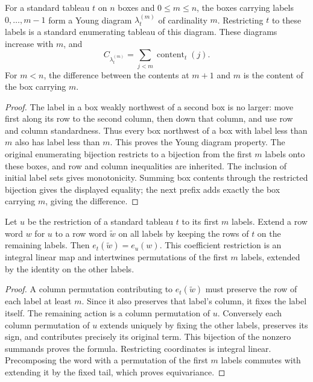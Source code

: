 \begin{lemma}
\label{lem:standard-prefix-diagram}
\leanok
For a standard tableau $t$ on $n$ boxes and $0\leq m\leq n$, the
boxes carrying labels $0,\ldots,m-1$ form a Young diagram
$\lambda_t^{(m)}$ of cardinality $m$. Restricting $t$ to these labels
is a standard enumerating tableau of this diagram. These diagrams
increase with $m$, and
\[
 C_{\lambda_t^{(m)}}=\sum_{j<m}\operatorname{content}_t(j).
\]
For $m<n$, the difference between the contents at $m+1$ and $m$
is the content of the box carrying $m$.
\end{lemma}
\begin{proof}
The label in a box weakly northwest of a second box is no larger:
move first along its row to the second column, then down that column,
and use row and column standardness. Thus every box northwest of a
box with label less than $m$ also has label less than $m$. This proves
the Young diagram property. The original enumerating bijection
restricts to a bijection from the first $m$ labels onto these boxes,
and row and column inequalities are inherited. The inclusion of
initial label sets gives monotonicity. Summing box contents through
the restricted bijection gives the displayed equality; the next
prefix adds exactly the box carrying $m$, giving the difference.
\end{proof}

\begin{lemma}
\label{lem:polytabloid-prefix-restriction}
\leanok
Let $u$ be the restriction of a standard tableau $t$ to its first $m$
labels. Extend a row word $w$ for $u$ to a row word $\widetilde w$
on all labels by keeping the rows of $t$ on the remaining labels.
Then $e_t(\widetilde w)=e_u(w)$. This coefficient restriction is
an integral linear map and intertwines permutations of the first
$m$ labels, extended by the identity on the other labels.
\end{lemma}
\begin{proof}
A column permutation contributing to $e_t(\widetilde w)$ must
preserve the row of each label at least $m$. Since it also preserves
that label's column, it fixes the label itself. The remaining action
is a column permutation of $u$. Conversely each column permutation
of $u$ extends uniquely by fixing the other labels, preserves its
sign, and contributes precisely its original term. This bijection
of the nonzero summands proves the formula. Restricting coordinates
is integral linear. Precomposing the word with a permutation of the
first $m$ labels commutes with extending it by the fixed tail, which
proves equivariance.
\end{proof}

